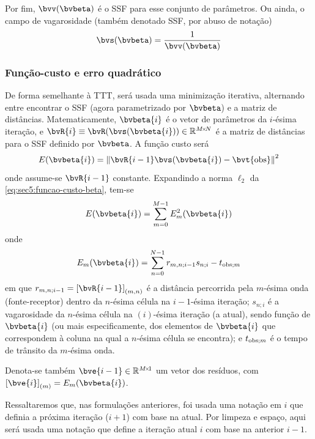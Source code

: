 Por fim, $\bvv(\bvbeta)$ é o SSF para esse conjunto de parâmetros. Ou ainda, o campo de vagarosidade (também denotado SSF, por abuso de notação)
\begin{equation}
	\bvs(\bvbeta) = \frac{1}{\bvv(\bvbeta)}
	\label{eq:sec5:ssf_usando_bvbeta}
\end{equation}

\subsubsection*{Função-custo e erro quadrático}

De forma semelhante à TTT, será usada uma minimização iterativa, alternando entre encontrar o SSF (agora parametrizado por $\bvbeta$) e a matriz de distâncias. Matematicamente, $\bvbeta{i}$ é o vetor de parâmetros da $i$-ésima iteração, e $\bvR{i} \equiv \bvR(\bvs(\bvbeta{i})) \in \re^{\sz{M}{N}}$ é a matriz de distâncias para o SSF definido por $\bvbeta$. A função custo será
\begin{equation}
	E(\bvbeta{i}) = \norm{\bvR{i-1} \bvs(\bvbeta{i}) - \bvt{\obs}}^2
	\label{eq:sec5:funcao-custo-beta}
\end{equation}
onde assume-se $\bvR{i-1}$ constante. Expandindo a norma $\ell_2$ da \cref{eq:sec5:funcao-custo-beta}, tem-se
\begin{equation}
	E(\bvbeta{i}) = \sum_{m=0}^{M-1} E_m^2(\bvbeta{i})
\end{equation}
onde
\begin{equation}
	E_m(\bvbeta{i}) = \sum_{n=0}^{N-1} r_{m,n;i-1} s_{n;i} - t_{\obs;m}
\end{equation}
em que $r_{m,n;i-1} = \el{\bvR{i-1}}{m,n}$ é a distância percorrida pela $m$-ésima onda (fonte-receptor) dentro da $n$-ésima célula na $i-1$-ésima iteração; $s_{n;i}$ é a vagarosidade da $n$-ésima célula na $(i)$-ésima iteração (a atual), sendo função de $\bvbeta{i}$ (ou mais especificamente, dos elementos de $\bvbeta{i}$ que correspondem à coluna na qual a $n$-ésima célula se encontra); e $t_{\operatorname{obs};m}$ é o tempo de trânsito da $m$-ésima onda.

Denota-se também $\bve{i-1} \in \re^{\sz{M}{1}}$ um vetor dos resíduos, com $\el{\bve{i}}{m} = E_m(\bvbeta{i})$.

Ressaltaremos que, nas formulações anteriores, foi usada uma notação em $i$ que definia a próxima iteração ($i+1$) com base na atual. Por limpeza e espaço, aqui será usada uma notação que define a iteração atual $i$ com base na anterior $i-1$.

